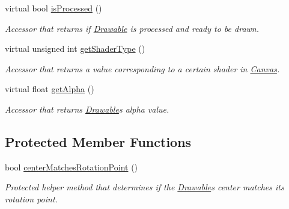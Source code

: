 \begin{DoxyCompactItemize}
virtual bool \hyperlink{classtsgl_1_1_drawable_a98562ec95c8621ba9b46d7bd0c0ffece}{is\+Processed} ()
\begin{DoxyCompactList}\small\item\em Accessor that returns if \hyperlink{classtsgl_1_1_drawable}{Drawable} is processed and ready to be drawn. \end{DoxyCompactList}\item 
virtual unsigned int \hyperlink{classtsgl_1_1_drawable_a2985b1872024a4c0469e9953c60db728}{get\+Shader\+Type} ()
\begin{DoxyCompactList}\small\item\em Accessor that returns a value corresponding to a certain shader in \hyperlink{classtsgl_1_1_canvas}{Canvas}. \end{DoxyCompactList}\item 
virtual float \hyperlink{classtsgl_1_1_drawable_aa153a0c0a4eaaa9bf4b7640508d58850}{get\+Alpha} ()
\begin{DoxyCompactList}\small\item\em Accessor that returns \hyperlink{classtsgl_1_1_drawable}{Drawable}\textquotesingle{}s alpha value. \end{DoxyCompactList}\end{DoxyCompactItemize}
\subsection*{Protected Member Functions}
\begin{DoxyCompactItemize}
\item 
bool \hyperlink{classtsgl_1_1_drawable_a21c86457e72d4ce01309dff922e23ab5}{center\+Matches\+Rotation\+Point} ()
\begin{DoxyCompactList}\small\item\em Protected helper method that determines if the \hyperlink{classtsgl_1_1_drawable}{Drawable}\textquotesingle{}s center matches its rotation point. \end{DoxyCompactList}\end{DoxyCompactItemize}
